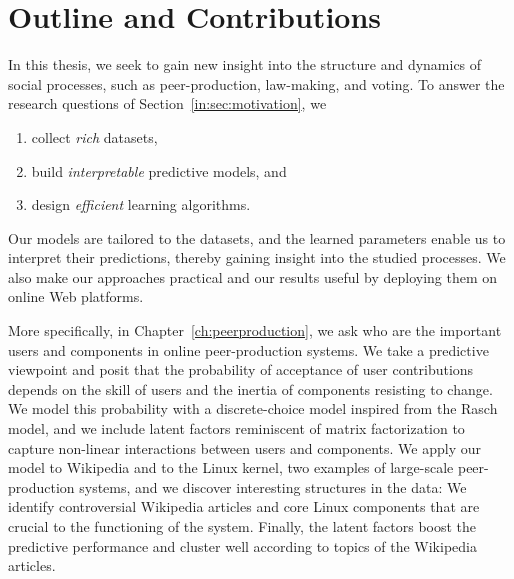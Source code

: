 \section{Outline and Contributions}
\label{in:sec:outline}

In this thesis, we seek to gain new insight into the structure and dynamics of social processes, such as peer-production, law-making, and voting.
To answer the research questions of Section~\ref{in:sec:motivation}, we
\begin{enumerate}
	\item collect \emph{rich} datasets,
	\item build \emph{interpretable} predictive models, and
	\item design \emph{efficient} learning algorithms.
\end{enumerate}
Our models are tailored to the datasets, and the learned parameters enable us to interpret their predictions, thereby gaining insight into the studied processes.
We also make our approaches practical and our results useful by deploying them on online Web platforms.


More specifically, in Chapter~\ref{ch:peerproduction}, we ask who are the important users and components in online peer-production systems.
We take a predictive viewpoint and posit that the probability of acceptance of user contributions depends on the skill of users and the inertia of components resisting to change.
We model this probability with a discrete-choice model inspired from the Rasch model, and we include latent factors reminiscent of matrix factorization to capture non-linear interactions between users and components.
We apply our model to Wikipedia and to the Linux kernel, two examples of large-scale peer-production systems, and we discover interesting structures in the data:
We identify controversial Wikipedia articles and core Linux components that are crucial to the functioning of the system.
Finally, the latent factors boost the predictive performance and cluster well according to topics of the Wikipedia articles.

